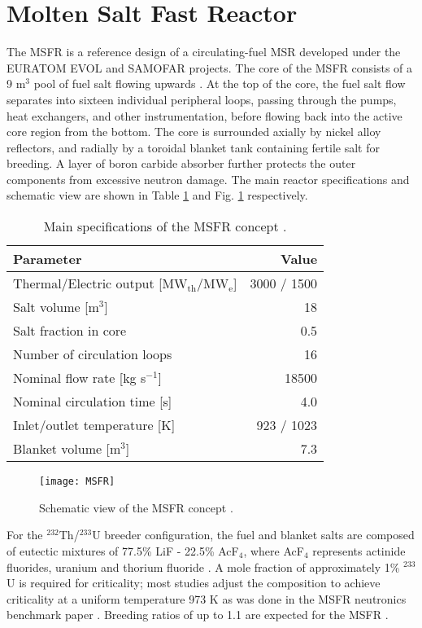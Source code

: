 \section{Molten Salt Fast Reactor}

The \gls{MSFR} is a reference design of a circulating-fuel \gls{MSR} developed
under the EURATOM \gls{EVOL} \cite{euratom_final_2015} and \gls{SAMOFAR}
\cite{kloosterman_20_2017} projects. The core of the
\gls{MSFR} consists of a 9 m$^3$ pool of fuel salt flowing upwards
\cite{serp_molten_2014}. At the top
of the core, the fuel salt flow separates into sixteen individual peripheral
loops, passing through the pumps, heat exchangers, and other instrumentation,
before flowing back into the active core region from the bottom. The core is
surrounded axially by nickel alloy reflectors, and radially by a toroidal
blanket tank containing fertile salt for
breeding. A layer of boron carbide absorber further protects the outer
components from excessive neutron damage. The main reactor specifications and
schematic view are shown in Table \ref{table:msfr} and Fig. \ref{fig:msfr}
respectively. 
%
\begin{table}[htb!]
	\caption{Main specifications of the \gls{MSFR} concept
				\cite{serp_molten_2014}.}
	\centering
	\begin{tabular}{ l r }
		\hline
		Parameter & Value \\
		\hline
		Thermal/Electric output [MW$_{\text{th}}$/MW$_{\text{e}}$] & 3000 /
		1500 
		\\
		Salt volume [m$^3$] & 18 \\
		Salt fraction in core & 0.5 \\
		Number of circulation loops & 16 \\
		Nominal flow rate [kg s$^{-1}$] & 18500  \\
		Nominal circulation time [s] & 4.0 \\
		Inlet/outlet temperature [K] & 923 / 1023 \\
		Blanket volume [m$^3$] & 7.3\\
		\hline
	\end{tabular}
	\label{table:msfr}
\end{table}
%
\begin{figure}[htb!] 
	\centering
	\texttt{[image: MSFR]}
	\caption{Schematic view of the MSFR concept \cite{serp_molten_2014}.}
	\label{fig:msfr}
\end{figure}

For the $^{232}$Th/$^{233}$U breeder configuration, the fuel and blanket salts
are composed of eutectic mixtures of 77.5\% LiF - 22.5\% AcF$_4$, where
AcF$_4$ represents actinide fluorides, uranium and thorium fluoride
\cite{serp_molten_2014}. A mole
fraction of approximately 1\% $^{233}$U is required for criticality; most
studies adjust the composition to achieve criticality at a uniform temperature
973 K as was done in the \gls{MSFR} neutronics benchmark paper
\cite{brovchenko_neutronic_2019}. Breeding ratios of up to 1.1 are expected
for the \gls{MSFR} \cite{fiorina_molten_2013}.

